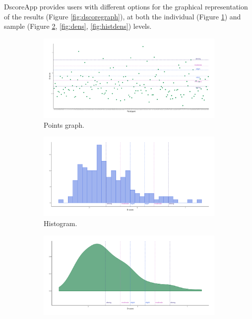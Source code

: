 \documentclass[12pt]{book}
\begin{document}
DscoreApp provides users with different options for the graphical representation of the results (Figure \ref{fig:dscoregraph}), at both the individual (Figure \ref{fig:point}) and sample (Figure \ref{fig:hist}, \ref{fig:dens}, \ref{fig:histdens}) levels. 
\begin{figure}[h!]
	\centering 
	\begin{subfigure}{0.45\linewidth}
		\includegraphics[width=\linewidth]{PointDefaultDscore3.pdf}
		\caption{Points graph.}
		\label{fig:point}
	\end{subfigure}
	\begin{subfigure}{0.45\linewidth}
		\includegraphics[width=\linewidth]{HistogramDscore3.pdf}
		\caption{Histogram.}
		\label{fig:hist}
	\end{subfigure}
	\begin{subfigure}{0.45\linewidth}
		\includegraphics[width=\linewidth]{DensityDscore3.pdf}

\end{subfigure}
\end{figure}
\end{document}
